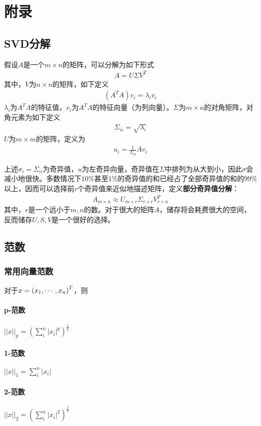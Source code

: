 \section{附录}
\subsection{SVD分解}
假设$A$是一个$m\times n$的矩阵，可以分解为如下形式
\begin{eqnarray}
A = U\Sigma V^T
\end{eqnarray}
其中，$V$为$n\times n$的矩阵，如下定义
\begin{eqnarray}
(A^TA)v_i=\lambda_iv_i
\end{eqnarray}
$\lambda_i$为$A^TA$的特征值，$v_i$为$A^TA$的特征向量（为列向量）。$\Sigma$为$m\times n$的对角矩阵，对角元素为如下定义
\begin{eqnarray}
\Sigma_{ii}=\sqrt{\lambda_i}
\end{eqnarray}
$U$为$m\times m$的矩阵，定义为
\begin{eqnarray}
u_i=\frac{1}{\Sigma_{ii}}Av_i
\end{eqnarray}

上述$\sigma_i=\Sigma_{ii}$为奇异值，$u$为左奇异向量，奇异值在$\Sigma$中排列为从大到小，因此$\sigma$会减小地很快。多数情况下$10\%$甚至$1\%$的奇异值的和已经占了全部奇异值的和的$99\%$以上，因而可以选择前$r$个奇异值来近似地描述矩阵，定义\textbf{部分奇异值分解}：
\begin{eqnarray}
A_{m\times n}\approx U_{m\times r}\Sigma_{r\times r}V^T_{r\times n}
\end{eqnarray}
其中，$r$是一个远小于$m,n$的数。对于很大的矩阵$A$，储存将会耗费很大的空间，反而储存$U,S,V$是一个很好的选择。

\subsection{范数}
\subsubsection{常用向量范数}
对于$x=\left( {x}_{1},\cdots,{x}_{n} \right)^T$，则
\paragraph{p-范数}$||x||_p = (\sum_i^n |x_i|^p)^{\frac{1}{p}}$
\paragraph{1-范数}$||x||_1 = \sum_i^n |x_i|$
\paragraph{2-范数}$||x||_2 = (\sum_i^n |x_i|^2)^{\frac{1}{2}}$
